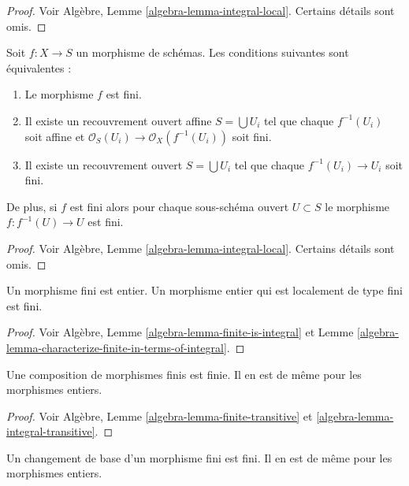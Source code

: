 \begin{proof}
Voir Algèbre, Lemme \ref{algebra-lemma-integral-local}. Certains détails
sont omis.
\end{proof}

\begin{lemma}
\label{lemma-finite-local}
Soit $f : X \to S$ un morphisme de schémas. Les conditions
suivantes sont équivalentes :
\begin{enumerate}
\item Le morphisme $f$ est fini.
\item Il existe un recouvrement ouvert affine $S = \bigcup U_i$
tel que chaque $f^{-1}(U_i)$
soit affine et $\mathcal{O}_S(U_i) \to \mathcal{O}_X(f^{-1}(U_i))$ soit fini.
\item Il existe un recouvrement ouvert $S = \bigcup U_i$
tel que chaque $f^{-1}(U_i) \to U_i$ soit fini.
\end{enumerate}
De plus, si $f$ est fini alors pour chaque sous-schéma
ouvert $U \subset S$ le morphisme $f : f^{-1}(U) \to U$ est fini.
\end{lemma}

\begin{proof}
Voir Algèbre, Lemme \ref{algebra-lemma-integral-local}. Certains détails
sont omis.
\end{proof}

\begin{lemma}
\label{lemma-finite-integral}
Un morphisme fini est entier.
Un morphisme entier qui est localement de type fini est fini.
\end{lemma}

\begin{proof}
Voir Algèbre, Lemme \ref{algebra-lemma-finite-is-integral}
et Lemme \ref{algebra-lemma-characterize-finite-in-terms-of-integral}.
\end{proof}

\begin{lemma}
\label{lemma-composition-finite}
Une composition de morphismes finis est finie. Il en
est de même pour les morphismes entiers.
\end{lemma}

\begin{proof}
Voir Algèbre, Lemme \ref{algebra-lemma-finite-transitive}
et \ref{algebra-lemma-integral-transitive}.
\end{proof}

\begin{lemma}
\label{lemma-base-change-finite}
Un changement de base d'un morphisme fini est fini. Il
en est de même pour les morphismes entiers.
\end{lemma}

